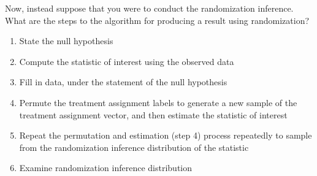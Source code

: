 \documentclass[
]{article}
\providecommand{\tightlist}{%
  \setlength{\itemsep}{0pt}\setlength{\parskip}{0pt}}
\theoremstyle{definition}
\theoremstyle{definition}
\theoremstyle{definition}
\theoremstyle{definition}
\theoremstyle{remark}
\begin{document}
Now, instead suppose that you were to conduct the randomization inference. What are the steps to the algorithm for producing a result using randomization?

\begin{enumerate}
\def\labelenumi{\arabic{enumi}.}
\tightlist
\item
  State the null hypothesis
\item
  Compute the statistic of interest using the observed data
\item
  Fill in data, under the statement of the null hypothesis
\item
  Permute the treatment assignment labels to generate a new sample of the treatment assignment vector, and then estimate the statistic of interest
\item
  Repeat the permutation and estimation (step 4) process repeatedly to sample from the randomization inference distribution of the statistic
\item
  Examine randomization inference distribution
\end{enumerate}
\end{document}

